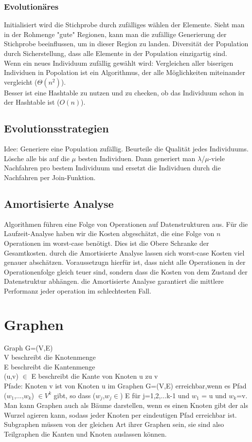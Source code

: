 \documentclass[jou,apacite]{apa6}
\begin{document}
\subsubsection{Evolutionäres}
Initialisiert wird die Stichprobe durch zufälliges wählen der Elemente. Sieht man in der Rohmenge "gute" Regionen, kann man die zufällige Generierung der Stichprobe beeinflussen, um in dieser Region zu landen. Diversität der Population durch Sicherstellung, dass alle Elemente in der Population einzigartig sind. \\
Wenn ein neues Individuum zufällig gewählt wird:
Vergleichen aller biserigen Individuen in Popolation ist ein Algorithmus, der alle Möglichkeiten miteinander vergleicht ($\Theta(n^2)$). \\ Besser ist eine Hashtable zu nutzen und zu checken, ob das Individuum schon in der Hashtable ist ($O(n)$).

\subsection{Evolutionsstrategien}
Idee: Generiere eine Population zufällig. Beurteile die Qualität jedes Individuums. Lösche alle bis auf die $\mu$ besten Individuen. Dann generiert man $\lambda$/$\mu$-viele Nachfahren pro bestem Individuum und ersetzt die Individuen durch die Nachfahren per Join-Funktion.

\subsection{Amortisierte Analyse}
Algorithmen führen eine Folge von Operationen auf Datenstrukturen aus. Für die Laufzeit-Analyse haben wir die Kosten abgeschätzt, die eine Folge von $n$ Operationen im worst-case benötigt. Dies ist die Obere Schranke der Gesamtkosten. durch die Amortisierte Analyse lassen sich worst-case Kosten viel genauer abschätzen. Voraussetzugn hierfür ist, dass nicht alle Operationen in der Operationenfolge gleich teuer sind, sondern dass die Kosten von dem Zustand der Datenstruktur abhängen. die Amortisierte Analyse garantiert die mittlere Performanz jeder operation im schlechtesten Fall. 

\section{Graphen}
Graph G=(V,E)\\
V beschreibt die Knotenmenge \\
E beschreibt die Kantenmenge \\
(u,v) $\in$ E beschreibt die Kante von Knoten u zu v \\
Pfade: Knoten v ist von Knoten u im Graphen G=(V,E) erreichbar,wenn es Pfad ($w_{1}$,...,$w_{k}$) $\in V^{k}$ gibt, so dass ($w_{j}$,$w_{j} \in$) E für j=1,2,...k-1 und $w_{1}$ = u und $w_{k}$=v. \\
Man kann Graphen auch als Bäume darstellen, wenn es einen Knoten gibt der als Wurzel agieren kann, sodass jeder Knoten per eindeutigen Pfad erreichbar ist. \\
Subgraphen müssen von der gleichen Art ihrer Graphen sein, sie sind also Teilgraphen die Kanten und Knoten auslassen können.
\end{document}
